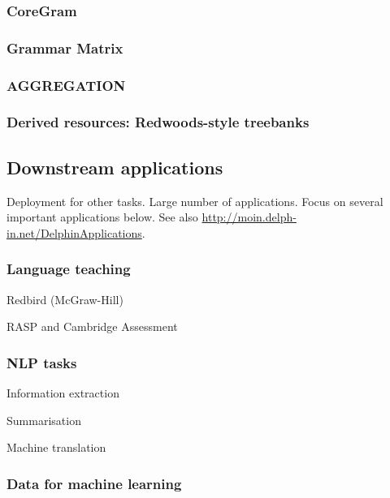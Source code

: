 \documentclass[output=paper]{langsci/langscibook}
\begin{document}

\subsubsection{CoreGram}

\subsubsection{Grammar Matrix}

\subsubsection{AGGREGATION}

\subsubsection{Derived resources: Redwoods-style treebanks}


\subsection{Downstream applications}

Deployment for other tasks.
Large number of applications.
Focus on several important applications below.
See also \url{http://moin.delph-in.net/DelphinApplications}.


\subsubsection{Language teaching}

Redbird (McGraw-Hill)

RASP and Cambridge Assessment


\subsubsection{NLP tasks}

Information extraction

Summarisation

Machine translation



\subsubsection{Data for machine learning}
\end{document}
